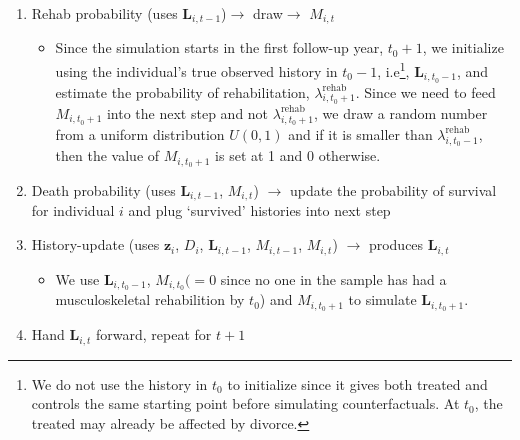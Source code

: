 \documentclass[a4paper,12pt]{article}
\theoremstyle{plain}
\theoremstyle{definition}
\theoremstyle{TheoremNum}
\theoremstyle{CorollaryNum}
\theoremstyle{PropositionNum}
\theoremstyle{TheoremNum}
\begin{document}
\begin{enumerate}
  \item Rehab probability (uses $\mathbf{L}_{i,t-1}$)$\rightarrow$ draw$\rightarrow$ $M_{i,t}$
  \begin{itemize}
	\item Since the simulation starts in the first follow-up year, $t_0+1$, we initialize using the individual's true observed history in $t_0 -1$, i.e\footnote{We do not use the history in $t_0$ to initialize since it gives both treated and controls the same starting point before simulating counterfactuals. At $t_0$, the treated may already be affected by divorce.}, $\mathbf{L}_{i,t_0-1}$, and estimate the probability of rehabilitation, $\lambda_{i,t_0+1}^{\text{rehab}}$. Since we need to feed $M_{i,t_0+1}$ into the next step and not $\lambda_{i,t_0+1}^{\text{rehab}}$, we draw a random number from a uniform distribution $U(0,1)$ and if it is smaller than $\lambda_{i,t_0-1}^{\text{rehab}}$, then the value of $M_{i,t_0+1}$ is set at 1 and 0 otherwise.
  \end{itemize}
  \item Death probability (uses $\mathbf{L}_{i,t-1}$, $M_{i,t}$) $\rightarrow$ update the probability of survival for individual $i$ and plug `survived' histories into next step
  \item History-update (uses $\mathbf{z}_i$, $D_i$, $\mathbf{L}_{i,t-1}$, $M_{i,t-1}$, $M_{i,t}$) $\rightarrow$ produces $\mathbf{L}_{i,t}$
  \begin{itemize}
	\item We use $\mathbf{L}_{i,t_0-1}$, $M_{i,t_0} (=0$ since no one in the sample has had a musculoskeletal rehabilition by $t_0$) and $M_{i,t_0+1}$ to simulate $\mathbf{L}_{i,t_0+1}$.
  \end{itemize}
  \item Hand $\mathbf{L}_{i,t}$ forward, repeat for $t+1$
\end{enumerate}
\end{document}
